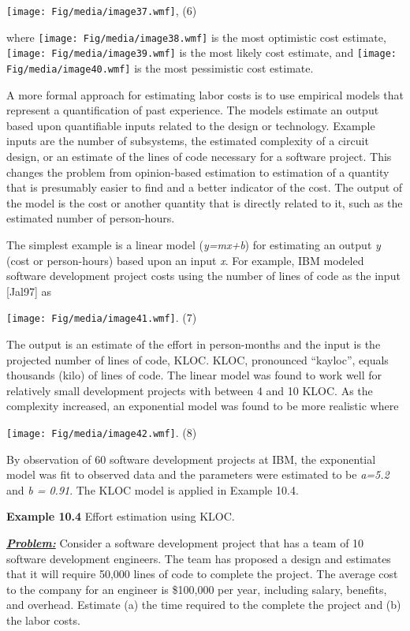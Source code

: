 \texttt{[image: Fig/media/image37.wmf]}, (6)

where \texttt{[image: Fig/media/image38.wmf]} is the most optimistic
cost estimate, \texttt{[image: Fig/media/image39.wmf]} is the most
likely cost estimate, and \texttt{[image: Fig/media/image40.wmf]} is the
most pessimistic cost estimate.

A more formal approach for estimating labor costs is to use empirical
models that represent a quantification of past experience. The models
estimate an output based upon quantifiable inputs related to the design
or technology. Example inputs are the number of subsystems, the
estimated complexity of a circuit design, or an estimate of the lines of
code necessary for a software project. This changes the problem from
opinion-based estimation to estimation of a quantity that is presumably
easier to find and a better indicator of the cost. The output of the
model is the cost or another quantity that is directly related to it,
such as the estimated number of person-hours.

The simplest example is a linear model (\emph{y=mx+b}) for estimating an
output \emph{y} (cost or person-hours) based upon an input \emph{x}. For
example, IBM modeled software development project costs using the number
of lines of code as the input {[}Jal97{]} as

\texttt{[image: Fig/media/image41.wmf]}. (7)

The output is an estimate of the effort in person-months and the input
is the projected number of lines of code, KLOC. KLOC, pronounced
``kayloc'', equals thousands (kilo) of lines of code. The linear model
was found to work well for relatively small development projects with
between 4 and 10 KLOC. As the complexity increased, an exponential model
was found to be more realistic where

\texttt{[image: Fig/media/image42.wmf]}. (8)

By observation of 60 software development projects at IBM, the
exponential model was fit to observed data and the parameters were
estimated to be \emph{a=5.2} and \emph{b = 0.91}. The KLOC model is
applied in Example 10.4.

\textbf{Example 10.4} Effort estimation using KLOC.

\emph{\textbf{\ul{Problem:}}} Consider a software development project
that has a team of 10 software development engineers. The team has
proposed a design and estimates that it will require 50,000 lines of
code to complete the project. The average cost to the company for an
engineer is \$100,000 per year, including salary, benefits, and
overhead. Estimate (a) the time required to the complete the project and
(b) the labor costs.

